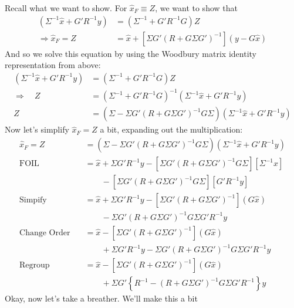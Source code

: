 \documentclass[a4paper,12pt]{article}
\begin{document}
Recall what we want to show.  For $\hat{x}_F \equiv Z$, we want
to show that
\begin{align*}
    (\Sigma^{-1} \hat{x} + G'R^{-1}y)
	&= \left( \Sigma^{-1} + G'R^{-1}G\right) Z \\
    \Rightarrow
    \hat{x}_F = Z
        &= \hat{x}
        + \left[\Sigma G' (R + G \Sigma G')^{-1}  \right]
        \left( y - G \hat{x} \right)
\end{align*}
And so we solve this equation by using the Woodbury matrix
identity representation from above:
\begin{align*}
    (\Sigma^{-1} \hat{x} + G'R^{-1}y) &=
	\left( \Sigma^{-1} + G'R^{-1}G\right) Z \\
    \Rightarrow \quad Z &=
	\left( \Sigma^{-1} + G'R^{-1}G\right)^{-1}
	(\Sigma^{-1} \hat{x} + G'R^{-1}y) \\
    Z &=
	\left( \Sigma - \Sigma G'(R
	+ G\Sigma G')^{-1}
	G\Sigma\right) \left(\Sigma^{-1} \hat{x}
	+ G'R^{-1}y\right)
\end{align*}
Now let's simplify $\hat{x}_F = Z$ a bit,
expanding out the multiplication:
\begin{align*}
    \hat{x}_F = Z &=
	\left( \Sigma - \Sigma G'(R
	+ G\Sigma G')^{-1}
	G\Sigma\right) \left(\Sigma^{-1} \hat{x}
	+ G'R^{-1}y\right) \\
    \text{FOIL} \quad &= \hat{x} + \Sigma G' R^{-1} y -
	\left[\Sigma G' (R + G \Sigma G')^{-1} G \Sigma\right]
	\left[ \Sigma^{-1} \hat{x} \right]  \\
    &\qquad - \left[\Sigma G' (R+ G \Sigma G')^{-1}G\Sigma \right]
	\left[G' R^{-1} y \right] \\
    \text{Simpify} \quad &= \hat{x} + \Sigma G' R^{-1} y -
	\left[\Sigma G' (R + G \Sigma G')^{-1}  \right]
	\left( G \hat{x} \right)  \\
    &\qquad - \Sigma G' (R+ G \Sigma G')^{-1}G\Sigma
	G' R^{-1} y  \\
    \text{Change Order} \quad &= \hat{x}
	- \left[\Sigma G' (R + G \Sigma G')^{-1}  \right]
	\left( G \hat{x} \right)  \\
    &\qquad
	+ \Sigma G'  R^{-1} y
	- \Sigma G' (R+ G \Sigma G')^{-1}G\Sigma
	G' R^{-1} y \\
    \text{Regroup} \quad &= \hat{x}
	- \left[\Sigma G' (R + G \Sigma G')^{-1}  \right]
	\left( G \hat{x} \right)  \\
    &\qquad
	+ \Sigma G'  \left\{ R^{-1}
	-  (R+ G \Sigma G')^{-1}G\Sigma
	G' R^{-1} \right\} y
\end{align*}
Okay, now let's take a breather.  We'll make this a bit
\end{document}
